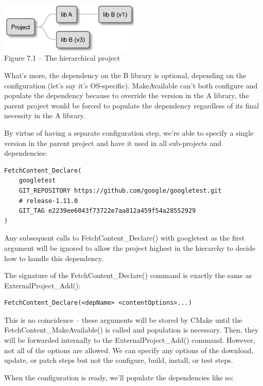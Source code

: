 \begin{center}
\includegraphics[width=0.5\textwidth]{content/2/chapter7/images/1.jpg}\\
Figure 7.1 – The hierarchical project
\end{center}

What's more, the dependency on the B library is optional, depending on the configuration (let's say it's OS-specific). MakeAvailable can't both configure and populate the dependency because to override the version in the A library, the parent project would be forced to populate the dependency regardless of its final necessity in the A library.

By virtue of having a separate configuration step, we're able to specify a single version in the parent project and have it used in all sub-projects and dependencies:

\begin{lstlisting}[style=styleCMake]
FetchContent_Declare(
	googletest
	GIT_REPOSITORY https://github.com/google/googletest.git
	# release-1.11.0
	GIT_TAG e2239ee6043f73722e7aa812a459f54a28552929
)
\end{lstlisting} 

Any subsequent calls to FetchContent\_Declare() with googletest as the first argument will be ignored to allow the project highest in the hierarchy to decide how to handle this dependency.

The signature of the FetchContent\_Declare() command is exactly the same as ExternalProject\_Add():

\begin{lstlisting}[style=styleCMake]
FetchContent_Declare(<depName> <contentOptions>...)
\end{lstlisting} 

This is no coincidence – these arguments will be stored by CMake until the FetchContent\_MakeAvailable() is called and population is necessary. Then, they will be forwarded internally to the ExternalProject\_Add() command. However, not all of the options are allowed. We can specify any options of the download, update, or patch steps but not the configure, build, install, or test steps.

When the configuration is ready, we'll populate the dependencies like so:

